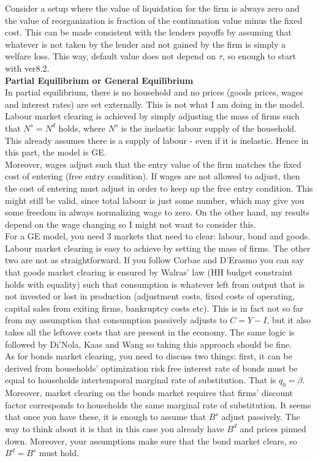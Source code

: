\documentclass[12pt]{article}
\begin{document}
Consider a setup where the value of liquidation for the firm is always zero and the value of reorganization is fraction of the continuation value minus the fixed cost. This can be made consistent with the lenders payoffs by assuming that whatever is not taken by the lender and not gained by the firm is simply a welfare loss. This way, default value does not depend on $\tau$, so enough to start with ver8.2. \vspace{3mm} \\
\textbf{Partial Equilibrium or General Equilibrium} \\
In partial equilibrium, there is no household and no prices (goods prices, wages and interest rates) are set externally. This is not what I am doing in the model. Labour market clearing is achieved by simply adjusting the mass of firms such that $N^s = N^d$ holds, where $N^s$ is the inelastic labour supply of the household. This already assumes there is a supply of labour - even if it is inelastic. Hence in this part, the model is GE. \vspace{3mm} \\
Moreover, wages adjust such that the entry value of the firm matches the fixed cost of entering (free entry condition). If wages are not allowed to adjust, then the cost of entering must adjust in order to keep up the free entry condition. This might still be valid, since total labour is just some number, which may give you some freedom in always normalizing wage to zero. On the other hand, my results depend on the wage changing so I might not want to consider this. \vspace{3mm} \\
For a GE model, you need 3 markets that need to clear: labour, bond and goods. Labour market clearing is easy to achieve by setting the mass of firms. The other two are not as straightforward. If you follow Corbae and D'Erasmo you can say that goods market clearing is ensured by Walras' law (HH budget constraint holds with equality) such that consumption is whatever left from output that is not invested or lost in production (adjustment costs, fixed costs of operating, capital sales from exiting firms, bankruptcy costs etc). This is in fact not so far from my assumption that consumption passively adjusts to $C = Y - I$, but it also takes all the leftover costs that are present in the economy. The same logic is followed by Di'Nola, Kaas and Wang so taking this approach should be fine.  \vspace{3mm} \\ 
As for bonds market clearing, you need to discuss two things: first, it can be derived from households' optimization risk free interest rate of bonds must be equal to households intertemporal marginal rate of substitution. That is $q_0 = \beta$. Moreover, market clearing on the bonds market requires that firms' discount factor corresponds to households the same marginal rate of substitution. It seems that once you have these, it is enough to assume that $B^s$ adjust passively. The way to think about it is that in this case you already have $B^d$ and prices pinned down. Moreover, your assumptions make sure that the bond market clears, so $B^d = B^s$ must hold. \vspace{3mm} \\
\end{document}
